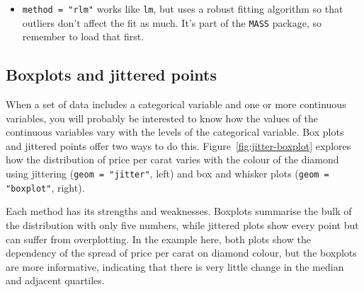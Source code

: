 \begin{itemize}
    

  \item {\tt method = "rlm"} works like {\tt lm}, but uses a robust fitting algorithm so that outliers don't affect the fit as much.  It's part of the {\tt MASS} package, so remember to load that first.

\end{itemize}

\subsection{Boxplots and jittered points}
\label{sub:boxplot}

When a set of data includes a categorical variable and one or more continuous variables, you will probably be interested to know how the values of the continuous variables vary with the levels of the categorical variable.  Box plots and jittered points offer two ways to do this.  Figure~\ref{fig:jitter-boxplot} explores how the distribution of price per carat varies with the colour of the diamond using jittering ({\tt geom = "jitter"}, left) and box and whisker plots ({\tt geom = "boxplot"}, right).

% 


Each method has its strengths and weaknesses. Boxplots summarise the bulk of the distribution with only five numbers, while jittered plots show every point but can suffer from overplotting. In the example here, both plots show the dependency of the spread of price per carat on diamond colour, but the boxplots are more informative, indicating that there is very little change in the median and adjacent quartiles.

